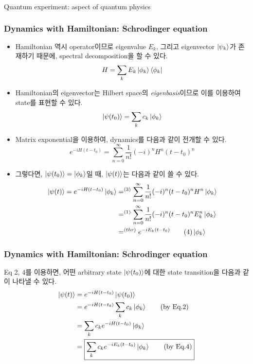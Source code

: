 \documentclass[9pt]{beamer}
\begin{document}
\begin{section}{Quantum experiment: aspect of quantum physics}
        \begin{frame}
            \frametitle{Dynamics with Hamiltonian: Schrodinger equation}
            \begin{itemize}
                \item Hamiltonian 역시 operator이므로 eigenvalue $E_k$, 그리고 eigenvector $\ket{\psi_k}$가 존재하기 때문에, spectral decomposition을 할 수 있다.
                \begin{equation}
                    H = \sum_k E_k \ket{\phi_k} \bra{\phi_k}
                \end{equation}
                \item Hamiltonian의 eigenvector는 Hilbert space의 \textit{eigenbasis}이므로 이를 이용하여 state를 표현할 수 있다.
                \begin{equation}
                    \ket{\psi(t_0)} = \sum_k c_k \ket{\phi_k}
                \end{equation}
                \item Matrix exponential을 이용하여, dynamics를 다음과 같이 전개할 수 있다.
                \begin{equation}
                    e^{-iH(t-t_0)} = \sum^\infty_{n=0} \frac{1}{n!}(-i)^n H^n (t-t_0)^n
                \end{equation}
                \item 그렇다면, $\ket{\psi(t_0)} = \ket{\phi_k}$일 때, $\ket{\psi(t)}$는 다음과 같이 쓸 수 있다.
                \begin{align*}
                    \ket{\psi(t)} = e^{-iH(t-t_0)}\ket{\phi_k} &=^{(3)} \sum^\infty_{n=0} \frac{1}{n!}(-i)^n (t-t_0)^n H^n \ket{\phi_k}   \\ &=^{(1)} \sum^\infty_{n=0} \frac{1}{n!}(-i)^n (t-t_0)^n E_k^n \ket{\phi_k} \\ &=^{(thr)} e^{-iE_k(t-t_0)} \tag{4}\ket{\phi_k} 
                \end{align*}
            \end{itemize}
        \end{frame}

        \begin{frame}
            \frametitle{Dynamics with Hamiltonian: Schrodinger equation}
            Eq 2, 4를 이용하면, 어떤 arbitrary state $\ket{\psi(t_0)}$에 대한 state transition을 다음과 같이 나타낼 수 있다.
            \begin{align*}\ket{\psi(t)} &= e^{-iH(t-t_0)}\ket{\psi(t_0)} \\&= e^{-iH(t-t_0)}\sum_k c_k \ket{\phi_k}\tag{by Eq.2} \\&=\sum_k c_ke^{-iH(t-t_0)} \ket{\phi_k} \\ &=\boxed{\sum_k c_ke^{-iE_k(t-t_0)}\ket{\phi_k}\tag{by Eq.4}}\end{align*}
            

\end{frame}
\end{section}
\end{document}

